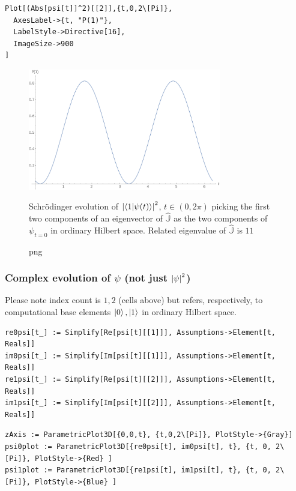 \begin{Verbatim}
Plot[(Abs[psi[t]]^2)[[2]],{t,0,2\[Pi]},
  AxesLabel->{t, "P(1)"},
  LabelStyle->Directive[16],
  ImageSize->900
]
\end{Verbatim}
\begin{figure}[!h]
  \centering
  \includegraphics[width=0.75\textwidth]{img/probB_1.png}
  \caption[]{png}{
    Schr{\"o}dinger evolution of
    $\qty|\braket{1}{\psi(t)}|^2$, $t \in (0, 2\pi) $
    picking the first two components of an eigenvector of $\hat{\mathbb{J}}$
    as the two components of $\psi_{t=0}$ in ordinary Hilbert space.
    Related eigenvalue of $\hat{\mathbb{J}}$ is $11$
  }
\end{figure}

\subsubsection{Complex evolution of $\psi$ (not just $\qty|\psi|^2$)}

Please note index count is
$1, 2$ (cells above)
but refers, respectively, to computational base elements
$\ket{0}, \ket{1}$ in ordinary Hilbert space.
\begin{Verbatim}
re0psi[t_] := Simplify[Re[psi[t][[1]]], Assumptions->Element[t, Reals]]
im0psi[t_] := Simplify[Im[psi[t][[1]]], Assumptions->Element[t, Reals]]
re1psi[t_] := Simplify[Re[psi[t][[2]]], Assumptions->Element[t, Reals]]
im1psi[t_] := Simplify[Im[psi[t][[2]]], Assumptions->Element[t, Reals]]
\end{Verbatim}

\begin{Verbatim}
zAxis := ParametricPlot3D[{0,0,t}, {t,0,2\[Pi]}, PlotStyle->{Gray}]
psi0plot := ParametricPlot3D[{re0psi[t], im0psi[t], t}, {t, 0, 2\[Pi]}, PlotStyle->{Red} ]
psi1plot := ParametricPlot3D[{re1psi[t], im1psi[t], t}, {t, 0, 2\[Pi]}, PlotStyle->{Blue} ]
\end{Verbatim}

